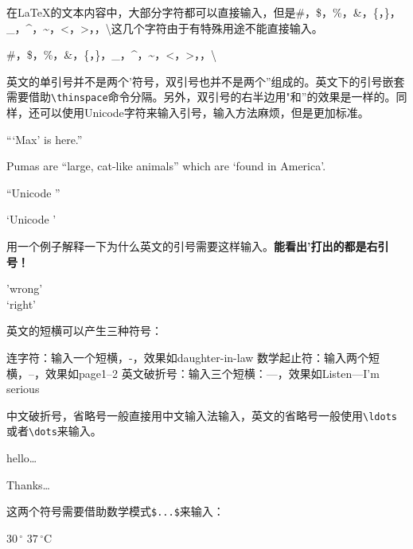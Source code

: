 在\LaTeX 的文本内容中，大部分字符都可以直接输入，但是\#，\$，\%，\&，\{，\}，\_，\^{}，\~{}，\textless，\textgreater，\textbar，\textbackslash 这几个字符由于有特殊用途不能直接输入。

\begin{codeshow}
\#，\$，\%，\&，\{，\}，\_，\^{}，\~{}，\textless，\textgreater，\textbar，\textbackslash
\end{codeshow}


英文的单引号并不是两个'符号，双引号也并不是两个''组成的。英文下的引号嵌套需要借助\lstinline{\thinspace}命令分隔。另外，双引号的右半边用"和''的效果是一样的。同样，还可以使用Unicode字符来输入引号，输入方法麻烦，但是更加标准。

\begin{codeshow}
``\thinspace`Max' is here.''\par
Pumas are ``large, cat-like animals'' which are `found in America'.\par
\textquotedblleft Unicode \textquotedblright \par
\textquoteleft Unicode \textquoteright
\end{codeshow}

用一个例子解释一下为什么英文的引号需要这样输入。\textbf{能看出'打出的都是右引号！}


\begin{codeshow}
'wrong'\\
`right'
\end{codeshow}


英文的短横可以产生三种符号：

连字符：输入一个短横，-，效果如daughter-in-law
数学起止符：输入两个短横，--，效果如page1--2
英文破折号：输入三个短横：---，效果如Listen---I'm serious

中文破折号，省略号一般直接用中文输入法输入，英文的省略号一般使用\lstinline|\ldots|或者\lstinline|\dots|来输入。

\begin{codeshow}
hello\ldots\par
Thanks\dots
\end{codeshow}

这两个符号需要借助数学模式\lstinline|$...$|来输入：
\begin{codeshow}
$30\,^{\circ}$
$37\,^{\circ}\mathrm{C}$
\end{codeshow}
